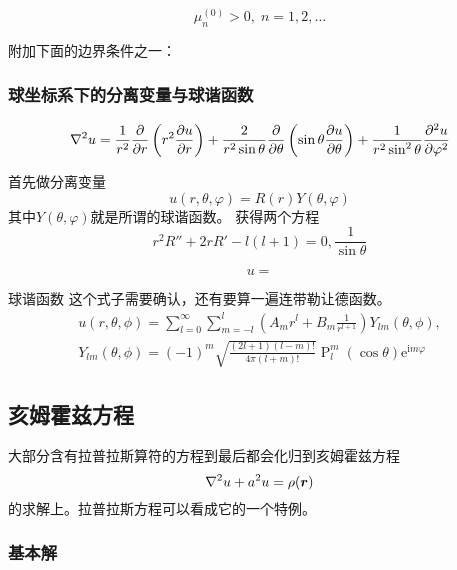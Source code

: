 \documentclass[UTF8]{ctexart}
\newcommand*{\ii}{\mathrm{i}}
\newcommand*{\ee}{\mathrm{e}}
\DeclareMathOperator{\legpoly}{P}
\begin{document}
\[
    \mu_n^{(0)} > 0, \; n = 1, 2, \ldots
\]

附加下面的边界条件之一：

\subsubsection{球坐标系下的分离变量与球谐函数}

\begin{equation}
    \laplacian u = \frac{1}{r^2} \pdv{r} \left( r^2 \pdv{u}{r} \right) + \frac{2}{r^2 \sin \theta} \pdv{\theta} \left( \sin \theta \pdv{u}{\theta} \right) + \frac{1}{r^2 \sin^2 \theta} \pdv[2]{u}{\varphi}
\end{equation}

首先做分离变量
\[
    u(r, \theta, \varphi) = R(r) Y(\theta, \varphi)
\]
其中$Y(\theta, \varphi)$就是所谓的球谐函数。
获得两个方程
\[
    r^2 R'' + 2 r R' - l(l+1) = 0, 
    \frac{1}{\sin \theta} 
\]

\begin{equation}
    u = 
\end{equation}

球谐函数
这个式子需要确认，还有要算一遍连带勒让德函数。
\begin{equation}
    \begin{split}
        u(r, \theta, \phi) = \sum_{l=0}^\infty \sum_{m=-l}^l (A_m r^l + B_m \frac{1}{r^{l+1}}) Y_{lm}(\theta, \phi), \\
        Y_{lm}(\theta, \phi) = (-1)^m \sqrt{\frac{(2l+1)(l-m)!}{4\pi (l+m)!}} \legpoly_l^m (\cos \theta) \ee^{\ii m \varphi}
    \end{split}
\end{equation}

\subsection{亥姆霍兹方程}

大部分含有拉普拉斯算符的方程到最后都会化归到亥姆霍兹方程
\begin{equation}
    \laplacian u + a^2 u = \rho(\vb*{r})
    \label{eq:helmholtz-eq}
\end{equation}
的求解上。拉普拉斯方程可以看成它的一个特例。

\subsubsection{基本解}
\end{document}
